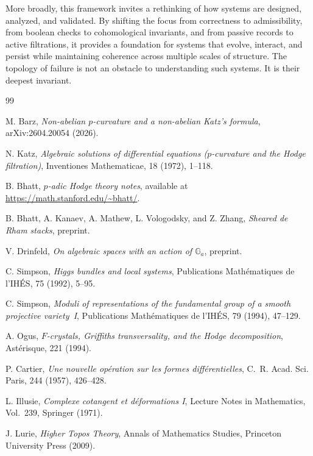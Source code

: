 \documentclass[12pt]{article}
\begin{document}
More broadly, this framework invites a rethinking of how systems are designed, analyzed,
and validated. By shifting the focus from correctness to admissibility, from boolean
checks to cohomological invariants, and from passive records to active filtrations, it
provides a foundation for systems that evolve, interact, and persist while maintaining
coherence across multiple scales of structure. The topology of failure is not an
obstacle to understanding such systems. It is their deepest invariant.

\newpage

\begin{thebibliography}{99}

M. Barz,
\textit{Non-abelian $p$-curvature and a non-abelian Katz's formula},
arXiv:2604.20054 (2026).

N. Katz,
\textit{Algebraic solutions of differential equations ($p$-curvature and the Hodge filtration)},
Inventiones Mathematicae, 18 (1972), 1--118.

B. Bhatt,
\textit{$p$-adic Hodge theory notes},
available at \url{https://math.stanford.edu/~bhatt/}.

B. Bhatt, A. Kanaev, A. Mathew, L. Vologodsky, and Z. Zhang,
\textit{Sheared de Rham stacks},
preprint.

V. Drinfeld,
\textit{On algebraic spaces with an action of $\mathbb{G}_a$},
preprint.

C. Simpson,
\textit{Higgs bundles and local systems},
Publications Math\'ematiques de l'IH\'ES, 75 (1992), 5--95.

C. Simpson,
\textit{Moduli of representations of the fundamental group of a smooth projective
variety~I},
Publications Math\'ematiques de l'IH\'ES, 79 (1994), 47--129.

A. Ogus,
\textit{$F$-crystals, Griffiths transversality, and the Hodge decomposition},
Ast\'erisque, 221 (1994).

P. Cartier,
\textit{Une nouvelle op\'eration sur les formes diff\'erentielles},
C.~R. Acad. Sci. Paris, 244 (1957), 426--428.

L. Illusie,
\textit{Complexe cotangent et d\'eformations I},
Lecture Notes in Mathematics, Vol.~239, Springer (1971).

J. Lurie,
\textit{Higher Topos Theory},
Annals of Mathematics Studies, Princeton University Press (2009).


\end{thebibliography}
\end{document}
